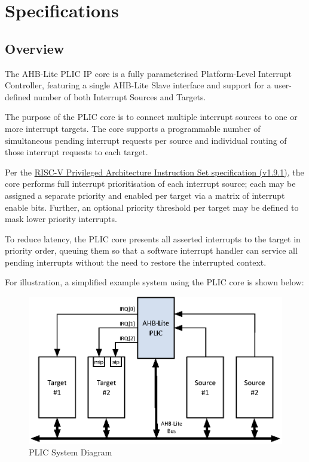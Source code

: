 \chapter{Specifications} \label{specifications}

\section{Overview}

The AHB-Lite PLIC IP core is a fully parameterised Platform-Level Interrupt
Controller, featuring a single AHB-Lite Slave interface and support for a user-defined number of both Interrupt Sources and Targets.

The purpose of the PLIC core is to connect multiple interrupt sources to
one or more interrupt targets. The core supports a programmable number
of simultaneous pending interrupt requests per source and individual routing of those interrupt requests to each target.

Per the \href{https://github.com/riscv/riscv-isa-manual/blob/master/release/riscv-privileged-v1.9.1.pdf}{RISC-V Privileged Architecture Instruction Set specification (v1.9.1)}, the core performs full interrupt prioritisation of each interrupt source; each may be assigned a separate priority and enabled per target via a matrix of interrupt enable bits. Further, an optional priority threshold per target may be defined to mask lower priority interrupts.

To reduce latency, the PLIC core presents all asserted interrupts to the target in priority order, queuing them so that a software interrupt handler can service all pending interrupts without the need to restore the interrupted context.

For illustration, a simplified example system using the PLIC core is shown below:

\begin{figure}[htb]
\includegraphics{assets/img/plic-system}
\caption{PLIC System Diagram}
\label{fig:SYSDIAG}
\end{figure}

